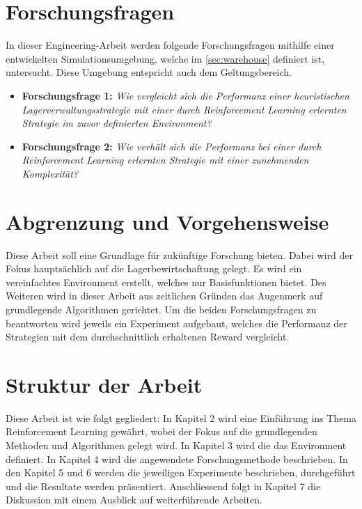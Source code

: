 \section{Forschungsfragen}
\label{sec:ff}
In dieser Engineering-Arbeit werden folgende Forschungsfragen mithilfe einer entwickelten Simulationsumgebung, welche im \autoref{sec:warehouse} definiert ist, untersucht. Diese Umgebung entspricht auch dem Geltungsbereich.
\begin{itemize}
	\item \textbf{Forschungsfrage 1:}
\emph{Wie vergleicht sich die Performanz einer heuristischen Lagerverwaltungsstrategie mit einer durch Reinforcement Learning erlernten Strategie im zuvor definierten Environment?}
	\item \textbf{Forschungsfrage 2:}
\emph{Wie verhält sich die Performanz bei einer durch Reinforcement Learning erlernten Strategie mit einer zunehmenden Komplexität?}
\end{itemize}

\section{Abgrenzung und Vorgehensweise}
Diese Arbeit soll eine Grundlage für zukünftige Forschung bieten. Dabei wird der Fokus hauptsächlich auf die Lagerbewirtschaftung gelegt. Es wird ein vereinfachtes Environment erstellt, welches nur Basisfunktionen bietet. Des Weiteren wird in dieser Arbeit aus zeitlichen Gründen das Augenmerk auf grundlegende Algorithmen gerichtet. 
Um die beiden Forschungsfragen zu beantworten wird jeweils ein Experiment aufgebaut, welches die Performanz der Strategien mit dem durchschnittlich erhaltenen Reward vergleicht.
\section{Struktur der Arbeit}
Diese Arbeit ist wie folgt gegliedert: In Kapitel 2 wird eine Einführung ins Thema Reinforcement Learning gewährt, wobei der Fokus auf die grundlegenden Methoden und Algorithmen gelegt wird. In Kapitel 3 wird die das Environment definiert. In Kapitel 4 wird die angewendete Forschungsmethode beschrieben. In den Kapitel 5 und 6 werden die jeweiligen Experimente beschrieben, durchgeführt und die Resultate werden präsentiert. Anschliessend folgt in Kapitel 7 die Diskussion mit einem Ausblick auf weiterführende Arbeiten.